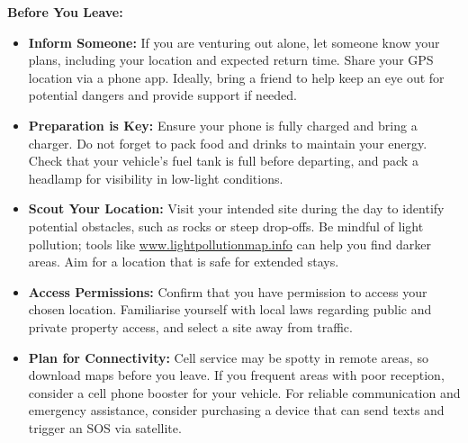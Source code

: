 \documentclass{article}
\begin{document}
\noindent\newline\textbf{Before You Leave:}
\begin{itemize}
    \item \textbf{Inform Someone:} If you are venturing out alone, let someone know your plans, including your location and expected return time. Share your GPS location via a phone app. Ideally, bring a friend to help keep an eye out for potential dangers and provide support if needed.
    \item \textbf{Preparation is Key:} Ensure your phone is fully charged and bring a charger. Do not forget to pack food and drinks to maintain your energy. Check that your vehicle’s fuel tank is full before departing, and pack a headlamp for visibility in low-light conditions.
    \item \textbf{Scout Your Location:} Visit your intended site during the day to identify potential obstacles, such as rocks or steep drop-offs. Be mindful of light pollution; tools like \url{www.lightpollutionmap.info} can help you find darker areas. Aim for a location that is safe for extended stays.
    \item \textbf{Access Permissions:} Confirm that you have permission to access your chosen location. Familiarise yourself with local laws regarding public and private property access, and select a site away from traffic.
    \item \textbf{Plan for Connectivity:} Cell service may be spotty in remote areas, so download maps before you leave. If you frequent areas with poor reception, consider a cell phone booster for your vehicle. For reliable communication and emergency assistance, consider purchasing a device that can send texts and trigger an SOS via satellite.
\end{itemize}
\end{document}
